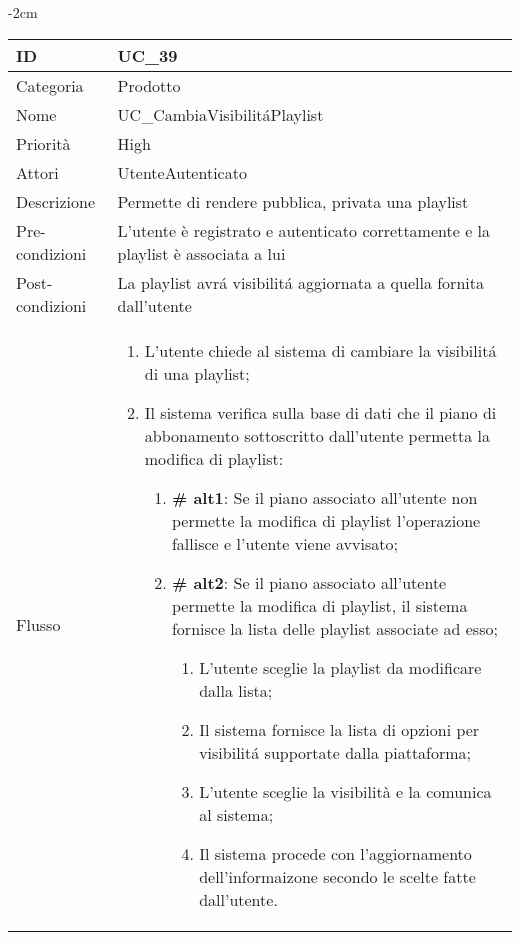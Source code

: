 \begin{center}
\begin{table}[bp]
    \centering
    \addtolength{\leftskip} {-2cm}
\begin{tabular}{ |p{2.6cm}|p{13cm}|  }
\hline
ID & UC\_39\\\hline
Categoria & Prodotto \\\hline
Nome & UC\_CambiaVisibilit\'aPlaylist\\\hline
Priorità & High \\\hline
Attori &  UtenteAutenticato \\\hline
Descrizione & Permette di rendere pubblica, privata una playlist\\\hline
Pre-condizioni & L'utente è registrato e autenticato correttamente e la playlist è associata a lui\\\hline
Post-condizioni & La playlist avr\'a visibilit\'a aggiornata a quella fornita dall'utente\\\hline
Flusso &  	\vspace{-5mm} \begin{enumerate}
		\item L'utente chiede al sistema di cambiare la visibilit\'a di una playlist;
		\item Il sistema verifica sulla base di dati che il piano di abbonamento sottoscritto dall'utente permetta la modifica di playlist:
		 \begin{enumerate}[label*=\arabic*.]
			\item \textbf{\# alt1}: Se il piano associato all'utente non permette la modifica di playlist l'operazione fallisce e l'utente viene avvisato;
			\item \textbf{\# alt2}: Se il piano associato all'utente permette la modifica di playlist, il sistema  fornisce la lista delle playlist associate ad esso;
			\begin{enumerate}[label*=\arabic*.]
				\item L'utente sceglie la playlist da modificare dalla lista;
				\item Il sistema fornisce la lista di opzioni per visibilit\'a supportate dalla piattaforma;
				\item L'utente sceglie la visibilità e la comunica al sistema;
				\item Il sistema procede con l'aggiornamento dell'informaizone secondo le scelte fatte dall'utente.
			\end{enumerate}
					\end{enumerate}

		\end{enumerate}\\\hline
\end{tabular}
\label{table_use_case:39}\newline
\end{table}


\end{center}
